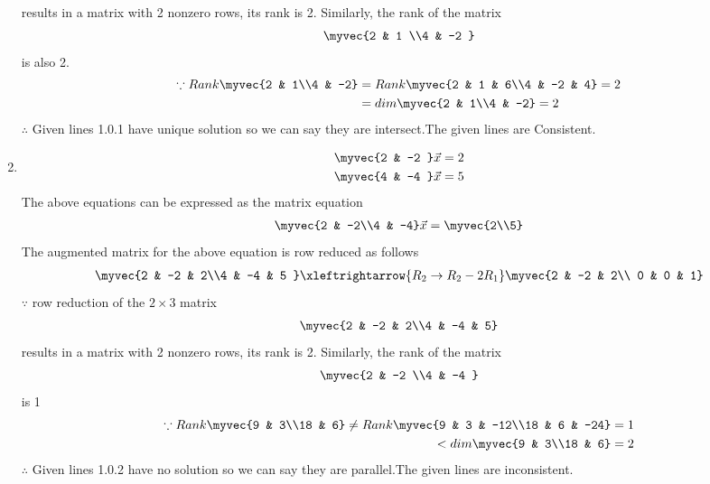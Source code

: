 \documentclass[journal,12pt,twocolumn]{IEEEtran}
\begin{document}
\begin{enumerate}
\begin{align}
\end{align}
%
results in a matrix with 2 nonzero rows, its rank is 2. 
%
Similarly, the rank of the matrix 
\begin{align}
\myvec{2 & 1 \\4 & -2 } 
\end{align}
%
is also 2.
%
\begin{align}
\because Rank \myvec{2 & 1\\4 & -2} &= Rank\myvec{2 & 1 & 6\\4 & -2 & 4}=2\nonumber\\
&=dim\myvec{2 & 1\\4 & -2}=2
\end{align}
$\therefore$ Given lines 1.0.1 have unique solution so we can say they are intersect.The given lines are Consistent.
%
\item
\begin{align}
\begin{split}
\myvec{2 & -2 }\vec{x}&=2
\\
\myvec{4 & -4 }\vec{x}&=5
\end{split}
\end{align}
The above equations can be expressed as the matrix equation
\begin{align}
\myvec{2 & -2\\4 & -4} \vec{x} = \myvec{2\\5}
\end{align}
%
The augmented matrix for the above equation is row reduced as follows
\begin{align}
\myvec{2 & -2 & 2\\4 & -4 & 5 } 
\xleftrightarrow{R_2 \rightarrow R_2-2R_1}
\myvec{2 & -2 & 2\\ 0 & 0 & 1}
\end{align}
%
$\because$ row reduction of the $2\times 3$ matrix
%
\begin{align}
\myvec{2 & -2 & 2\\4 & -4 & 5}
\end{align}
%
results in a matrix with 2 nonzero rows, its rank is 2. 
%
Similarly, the rank of the matrix 
\begin{align}
\myvec{2 & -2 \\4 & -4 } 
\end{align}
%
is 1
%
\begin{align}
\because Rank \myvec{9 & 3\\18 & 6} \ne Rank\myvec{9 & 3 & -12\\18 & 6 & -24}=1\nonumber\\<dim\myvec{9 & 3\\18 & 6}=2
\end{align}
$\therefore$ Given lines 1.0.2 have no solution so we can say they are parallel.The given lines are inconsistent.


\end{enumerate}
\end{document}
